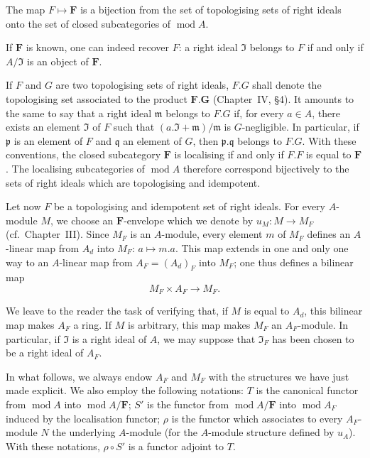 \begin{lemma}
The map $F\mapsto\mathbf{F}$ is a bijection from the set of
topologising sets of right ideals onto the set of closed subcategories
of $\operatorname{mod} A$.
\end{lemma}

If $\mathbf{F}$ is known, one can indeed recover $F$: a right ideal
$\mathfrak{I}$ belongs to $F$ if and only if $A/\mathfrak{I}$ is an
object of $\mathbf{F}$.

If $F$ and $G$ are two topologising sets of right ideals, $F.G$ shall
denote the topologising set associated to the product
$\mathbf{F}.\mathbf{G}$ (Chapter~IV, \S4). It amounts to the same to say
that a right ideal $\mathfrak{m}$ belongs to $F.G$ if, for every
$a\in A$, there exists an element $\mathfrak{I}$ of $F$ such that
$(a.\mathfrak{I}+\mathfrak{m})/\mathfrak{m}$ is $G$-negligible. In
particular, if $\mathfrak{p}$ is an element of $F$ and $\mathfrak{q}$ an
element of $G$, then $\mathfrak{p}.\mathfrak{q}$ belongs to $F.G$.
With these conventions, the closed subcategory $\mathbf{F}$ is
localising if and only if $F.F$ is equal to $\mathbf{F}$. The localising
subcategories of $\operatorname{mod} A$ therefore correspond
bijectively to the sets of right ideals which are topologising and
idempotent.

Let now $F$ be a topologising and idempotent set of right ideals. For
every $A$-module $M$, we choose an $\mathbf{F}$-envelope which we denote
by $u_M:M\to M_F$ (cf.\ Chapter~III). Since $M_F$ is an $A$-module, every
element $m$ of $M_F$ defines an $A$-linear map from $A_d$ into $M_F$:
$a\mapsto m.a$. This map extends in one and only one way to an
$A$-linear map from $A_F=(A_d)_F$ into $M_F$; one thus defines a bilinear
map
\[
M_F\times A_F\to M_F.
\]

We leave to the reader the task of verifying that, if $M$ is equal to
$A_d$, this bilinear map makes $A_F$ a ring. If $M$ is arbitrary, this
map makes $M_F$ an $A_F$-module. In particular, if $\mathfrak{I}$ is a
right ideal of $A$, we may suppose that $\mathfrak{I}_F$ has been
chosen to be a right ideal of $A_F$.

In what follows, we always endow $A_F$ and $M_F$ with the structures we
have just made explicit. We also employ the following notations: $T$ is
the canonical functor from $\operatorname{mod} A$ into
$\operatorname{mod} A/\mathbf{F}$; $S'$ is the functor from
$\operatorname{mod} A/\mathbf{F}$ into $\operatorname{mod} A_F$ induced
by the localisation functor; $\rho$ is the functor which associates to
every $A_F$-module $N$ the underlying $A$-module (for the $A$-module
structure defined by $u_A$). With these notations, $\rho\circ S'$ is a
functor adjoint to $T$.

